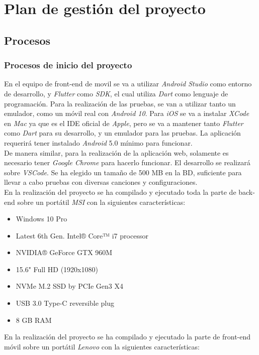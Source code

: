 \documentclass{article}
\begin{document}
\section{Plan de gestión del proyecto}

\subsection{Procesos}

\subsubsection{Procesos de inicio del proyecto}
En el equipo de front-end de movil se va a utilizar \textit{Android Studio} como entorno de desarrollo, y \textit{Flutter} como \textit{SDK}, el cual utiliza \textit{Dart} como lenguaje de programación. Para la realización de las pruebas, se van a utilizar tanto un emulador, como un móvil real con \textit{Android 10}. Para \textit{iOS} se va a instalar \textit{XCode} en \textit{Mac} ya que es el IDE oficial de \textit{Apple}, pero se va a mantener tanto \textit{Flutter} como \textit{Dart} para su desarrollo, y un emulador para las pruebas. La aplicación requerirá tener instalado \textit{Android} 5.0 mínimo para funcionar.\\
\hfill \break
De manera similar, para la realización de la aplicación web, solamente es necesario tener \textit{Google Chrome} para hacerlo funcionar. El desarrollo se realizará sobre \textit{VSCode}.
\hfill \break
Se ha elegido un tamaño de 500 MB en la BD, suficiente para llevar a cabo pruebas con diversas canciones y configuraciones.\\
\newpage
En la realización del proyecto se ha compilado y ejecutado toda la parte de back-end sobre un portátil \textit{MSI} con la siguientes características:
\begin{itemize}
	\item Windows 10 Pro
	\item Latest 6th Gen. Intel® Core™ i7 processor
	\item NVIDIA® GeForce GTX 960M
	\item 15.6" Full HD (1920x1080)
	\item NVMe M.2 SSD by PCIe Gen3 X4
	\item USB 3.0 Type-C reversible plug
	\item 8 GB RAM
\end{itemize}
En la realización del proyecto se ha compilado y ejecutado la parte de front-end móvil sobre un portátil \textit{Lenovo} con la siguientes características:
\end{document}
